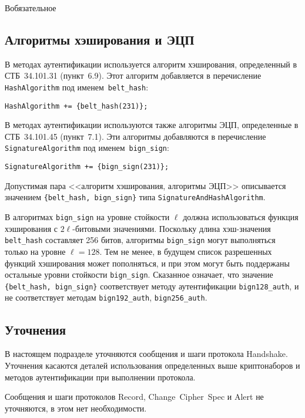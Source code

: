 \begin{appendix}{В}{обязательное}
\subsection{Алгоритмы хэширования и ЭЦП}\label{BSUITES.3.3}

В методах аутентификации используется алгоритм хэширования, определенный в 
СТБ~34.101.31 (пункт~6.9). Этот алгоритм добавляется в перечисление 
\lstinline{HashAlgorithm} под именем~\lstinline{belt_hash}:
\begin{lstlisting}
HashAlgorithm += {belt_hash(231)};
\end{lstlisting}
 
В методах аутентификации используются также алгоритмы ЭЦП, определенные в 
СТБ~34.101.45 (пункт~7.1). Эти алгоритмы добавляются в перечисление 
\lstinline{SignatureAlgorithm} под именем~\lstinline{bign_sign}: 
\begin{lstlisting}
SignatureAlgorithm += {bign_sign(231)};
\end{lstlisting}

Допустимая пара <<алгоритм хэширования, алгоритмы ЭЦП>> описывается значением 
\lstinline|{belt_hash, bign_sign}| типа \lstinline{SignatureAndHashAlgorithm}. 

В алгоритмах \lstinline{bign_sign} на уровне стойкости $\ell$ должна
использоваться функция хэширования с $2\ell$-битовыми значениями. Поскольку
длина хэш-значения \lstinline{belt_hash} составляет 256 битов, алгоритмы
\lstinline{bign_sign} могут выполняться только на уровне $\ell = 128$. Тем не
менее, в будущем список разрешенных функций хэширования может пополняться,
и при этом могут быть поддержаны остальные уровни стойкости
\lstinline{bign_sign}. Сказанное означает, что значение
\lstinline|{belt_hash, bign_sign}| соответствует методу аутентификации
\lstinline{bign128_auth}, и не соответствует методам
\lstinline{bign192_auth}, \lstinline{bign256_auth}.

\label{BSUITES.4}

\subsection{Уточнения}\label{BSUITES.4.1}

В настоящем подразделе уточняются сообщения и шаги протокола
Handshake. Уточнения касаются деталей использования
определенных выше криптонаборов и методов аутентификации при выполнении
протокола.

Сообщения и шаги протоколов Record, 
Change~Cipher~Spec и Alert не уточняются, в этом 
нет необходимости. 


\end{appendix}
